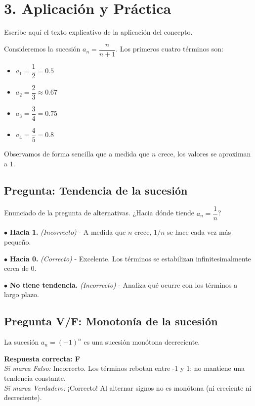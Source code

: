 \documentclass[11pt]{article}
\newenvironment{ejemplo}[1]{%
  \begin{tcolorbox}[colback=gray!5,colframe=gray!60!black,title=Ejemplo: #1]%
}{%
  \end{tcolorbox}%
}
\newenvironment{aplicacion}{%
  \section*{3. Aplicación y Práctica}%
}{}
\newenvironment{preguntaalternativas}[1]{\subsection*{Pregunta: #1}\par\vspace{0.1cm}}{\vspace{0.3cm}}
\newcommand{\opcion}[3]{\par\noindent $\bullet$ \textbf{#1} \textit{(#2)} - #3\par\vspace{0.15cm}}
\newenvironment{preguntaverdaderofalso}[1]{\subsection*{Pregunta V/F: #1}\par\vspace{0.1cm}}{\vspace{0.3cm}}
\newcommand{\verdaderofalso}[3]{\par\noindent\textbf{Respuesta correcta: #1} \\ \textit{Si marca Falso:} #2 \\ \textit{Si marca Verdadero:} #3\par\vspace{0.15cm}}
\begin{document}
\begin{aplicacion}
  Escribe aquí el texto explicativo de la aplicación del concepto.
  

  \begin{ejemplo}{Primeros términos de una sucesión}
    Consideremos la sucesión $a_n = \dfrac{n}{n+1}$. Los primeros cuatro términos son:
    \begin{itemize}
      \item $a_1 = \dfrac{1}{2} = 0.5$
      \item $a_2 = \dfrac{2}{3} \approx 0.67$
      \item $a_3 = \dfrac{3}{4} = 0.75$
      \item $a_4 = \dfrac{4}{5} = 0.8$
    \end{itemize}
    Observamos de forma sencilla que a medida que $n$ crece, los valores se aproximan a $1$.
  \end{ejemplo}

  \begin{preguntaalternativas}{Tendencia de la sucesión}
    Enunciado de la pregunta de alternativas. ¿Hacia dónde tiende $a_n = \dfrac{1}{n}$?
    
    \opcion{Hacia 1.}{Incorrecto}{A medida que $n$ crece, $1/n$ se hace cada vez más pequeño.}
    \opcion{Hacia 0.}{Correcto}{Excelente. Los términos se estabilizan infinitesimalmente cerca de 0.}
    \opcion{No tiene tendencia.}{Incorrecto}{Analiza qué ocurre con los términos a largo plazo.}
  \end{preguntaalternativas}

  \begin{preguntaverdaderofalso}{Monotonía de la sucesión}
    La sucesión $a_n = (-1)^n$ es una sucesión monótona decreciente.
    
    \verdaderofalso{F}
      {Incorrecto. Los términos rebotan entre -1 y 1; no mantiene una tendencia constante.}
      {¡Correcto! Al alternar signos no es monótona (ni creciente ni decreciente).}
  \end{preguntaverdaderofalso}


\end{aplicacion}
\end{document}
